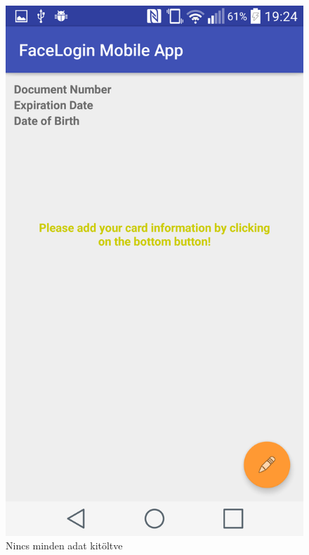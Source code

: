 \begin{figure}[h]
\begin{minipage}{.50\textwidth}
    \includegraphics[scale=0.07]{img/not_enough_mrtd_data}
    \caption{Nincs minden adat kitöltve}
 \end{minipage}


\end{figure}
